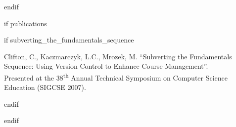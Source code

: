 \documentclass[11pt, letterpaper]{awesome-cv}
\begin{document}
\vspace{-5pt} %
\jinja endif

\jinja if publications
\vspace{5mm}

\jinja if subverting_the_fundamentals_sequence
	\begin{cvparagraph}
	Clifton, C., Kaczmarczyk, L.C., Mrozek, M. ``Subverting the Fundamentals Sequence: Using Version Control to Enhance Course Management''.\\
	Presented at the 38\textsuperscript{th} Annual Technical Symposium on Computer Science Education (SIGCSE 2007).
	\end{cvparagraph}
\jinja endif

\jinja endif
\end{document}
